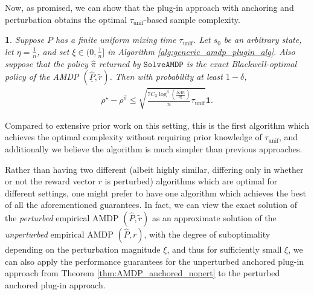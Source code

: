 \documentclass{article}
\theoremstyle{plain}
\theoremstyle{plain}
\theoremstyle{remark}
\theoremstyle{plain}
\newtheorem{cor}[thm]{\protect\corollaryname}
\theoremstyle{plain}
\providecommand{\corollaryname}{Corollary}
\newcommand{\Phat}{\widehat{P}}
\newcommand{\one}{\mathbf{1}}
\newcommand{\pihat}{\widehat{\pi}}
\newcommand{\tmix}{\tau_{\mathrm{unif}}}
\newcommand{\SolveAMDP}{\texttt{SolveAMDP}}
\newcommand{\Phatanc}{\underline{\Phat}}
\newcommand{\plugin}{plug-in\xspace}
\begin{document}
Now, as promised, we can show that the \plugin approach with anchoring and perturbation obtains the optimal $\tmix$-based sample complexity.
\begin{cor}
\label{thm:mixing_complexity}
    Suppose $P$ has a finite uniform mixing time $\tmix$.
    Let $s_0$ be an arbitrary state, let $\eta = \frac{1}{n}$, and set $\xi \in (0, \frac{1}{n}]$ in Algorithm \ref{alg:generic_amdp_plugin_alg}. Also suppose that the policy $\pihat$ returned by $\SolveAMDP$ is the exact Blackwell-optimal policy of the AMDP $(\Phatanc, \widetilde{r})$.
    Then with probability at least $1 - \delta$,
    \begin{align*}
        \rho^\star - \rho^{\pihat}  \leq \sqrt{\frac{7C_3  \log^3 \left( \frac{SAn}{ \delta \xi}\right) }{n}\tmix }\one.
    \end{align*}
\end{cor}
Compared to extensive prior work on this setting, this is the first algorithm which achieves the optimal complexity without requiring prior knowledge of $\tmix$, and additionally we believe the algorithm is much simpler than previous approaches.

Rather than having two different (albeit highly similar, differing only in whether or not the reward vector $r$ is perturbed) algorithms which are optimal for different settings, one might prefer to have one algorithm which achieves the best of all the aforementioned guarantees. In fact, we can view the exact solution of the \textit{perturbed} empirical AMDP $(\Phat, \widetilde{r})$ as an approximate solution of the \textit{unperturbed} empirical AMDP $(\Phat, r)$, with the degree of suboptimality depending on the perturbation magnitude $\xi$, and thus for sufficiently small $\xi$, we can also apply the performance guarantees for the unperturbed anchored \plugin approach from Theorem \ref{thm:AMDP_anchored_nopert} to the perturbed anchored \plugin approach.
\end{document}
